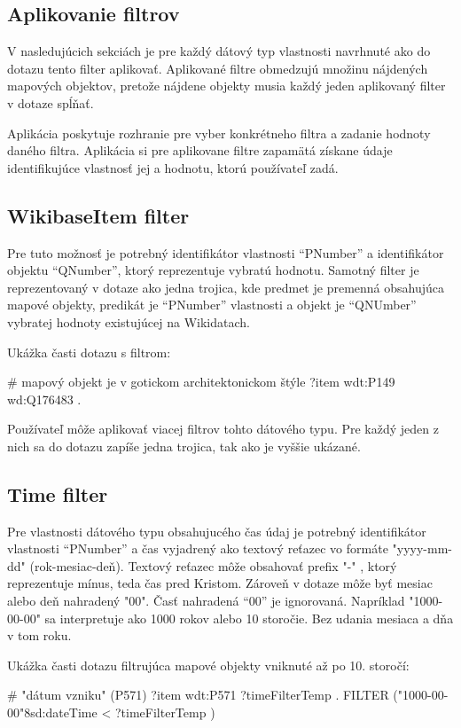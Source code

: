 \subsection*{Aplikovanie filtrov}
V nasledujúcich sekciách je pre každý dátový typ vlastnosti navrhnuté ako do dotazu tento filter aplikovať. 
Aplikované filtre obmedzujú množinu nájdených mapových objektov, pretože nájdene objekty musia každý jeden aplikovaný filter v dotaze spĺňať. 

Aplikácia poskytuje rozhranie pre vyber konkrétneho filtra a zadanie hodnoty daného filtra. Aplikácia 
si pre aplikovane filtre zapamätá získane údaje identifikujúce vlastnosť jej a hodnotu, ktorú používateľ zadá. 

\subsection*{WikibaseItem filter}
Pre tuto možnosť je potrebný identifikátor vlastnosti “PNumber” a identifikátor objektu “QNumber”, ktorý reprezentuje 
vybratú hodnotu. 
Samotný filter je reprezentovaný v dotaze ako jedna trojica, 
kde predmet je premenná obsahujúca mapové objekty, predikát je “PNumber” vlastnosti a objekt je “QNUmber” vybratej hodnoty existujúcej na Wikidatach. 

Ukážka časti dotazu s filtrom: 
\begin{code}
      # mapový objekt je v gotickom architektonickom štýle 
      ?item wdt:P149 wd:Q176483 .
\end{code}
Používateľ môže aplikovať viacej filtrov tohto dátového typu. Pre každý jeden z nich sa do dotazu zapíše jedna trojica, tak ako je vyššie ukázané. 

\subsection*{Time filter}
Pre vlastnosti dátového typu obsahujucého čas údaj je potrebný identifikátor vlastnosti “PNumber” a čas vyjadrený ako textový reťazec vo formáte 
"yyyy-mm-dd" (rok-mesiac-deň). Textový reťazec môže obsahovať prefix "-" , ktorý reprezentuje mínus, teda čas pred Kristom. 
Zároveň v dotaze môže byť mesiac alebo deň nahradený "00". Časť nahradená “00” je ignorovaná. 
Napríklad "1000-00-00" sa interpretuje ako 1000 rokov alebo 10 storočie. Bez udania mesiaca a dňa v tom roku. 


Ukážka časti dotazu filtrujúca mapové objekty 
vniknuté až po 10. storočí: 
\begin{code}
      # "dátum vzniku" (P571)
      ?item wdt:P571 ?timeFilterTemp .
      FILTER ("1000-00-00"^^xsd:dateTime < ?timeFilterTemp )
\end{code}

